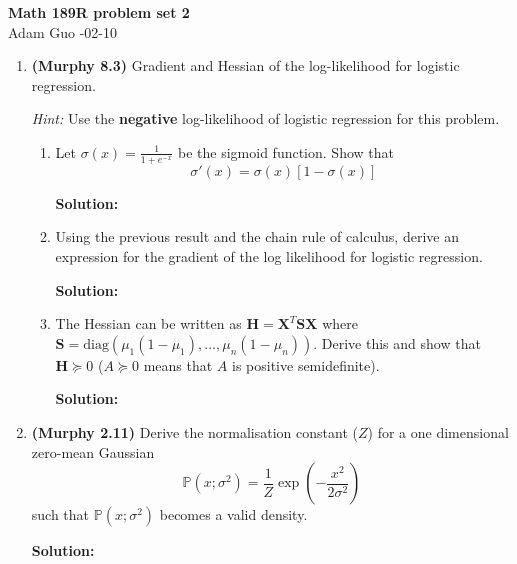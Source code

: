 \documentclass[letter,11pt]{article}
\newenvironment{solution}{
    \vspace{0.16in} {\bf Solution:}
    
}{
	\vspace{0.16in}
}
\begin{document}
\begin{center}
    {\bf \Large Math 189R problem set 2} \\
    \vspace{0.1in}
    Adam Guo -02-10
\end{center}

\begin{enumerate}
    \item \textbf{(Murphy 8.3)} Gradient and Hessian of the log-likelihood for logistic regression.

    \textit{Hint:} Use the \textbf{negative} log-likelihood of logistic regression for this problem.

    \begin{enumerate}
        \item Let $\sigma(x) = \frac{1}{1 + e^{-x}}$ be the sigmoid function. Show that \[\sigma'(x) = \sigma(x) [1 - \sigma(x)]\]

        \begin{solution}
        \end{solution}

        \item Using the previous result and the chain rule of calculus, derive an expression for the gradient of the log likelihood for logistic regression.

        \begin{solution}
        \end{solution}

        \item The Hessian can be written as $\textbf{H} = \textbf{X}^T \textbf{SX}$ where $\textbf{S} = \text{diag}(\mu_1 (1 - \mu_1), \dots, \mu_n (1 - \mu_n))$. Derive this and show that $\textbf{H} \succeq 0$ ($A \succeq 0$ means that $A$ is positive semidefinite).

        \begin{solution}
        \end{solution}
    \end{enumerate}

    \newpage


    \item \textbf{(Murphy 2.11)} Derive the normalisation constant ($Z$) for a one dimensional zero-mean Gaussian \[\mathbb{P}(x; \sigma^2) = \frac{1}{Z} \exp(-\frac{x^2}{2\sigma^2})\] such that $\mathbb{P}(x; \sigma^2)$ becomes a valid density.

    \begin{solution}
    \end{solution}


\end{enumerate}
\end{document}
